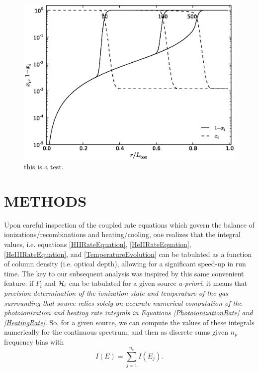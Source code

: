 \documentclass[preprint2]{aastex}              %
\begin{document}
\begin{figure}[htbp]
\begin{center}
\includegraphics[scale=0.4]{figures/RT_Test1_RadialProfiles.ps}
\caption{this is a test.}
\label{fig:test}
\end{center}
\end{figure}








\section{METHODS}
Upon careful inspection of the coupled rate equations which govern the balance of ionizations/recombinations and heating/cooling, one realizes that the integral values, i.e. equations \ref{HIIRateEquation}, \ref{HeIIRateEquation}, \ref{HeIIIRateEquation}, and \ref{TemperatureEvolution} can be tabulated as a function of column density (i.e. optical depth), allowing for a significant speed-up in run time.  The key to our subsequent analysis was inspired by this same convenient feature: if $\Gamma_i$ and $\mathcal{H}_i$ can be tabulated for a given source \textit{a-priori}, it means that \textit{precision determination of the ionization state and temperature of the gas surrounding that source relies solely on accurate numerical computation of the photoionization and heating rate integrals in Equations \ref{PhotoionizationRate} and \ref{HeatingRate}}.  So, for a given source, we can compute the values of these integrals numerically for the continuous spectrum, and then as discrete sums given $n_{\nu}$ frequency bins with 
\begin{equation}
    I(E) = \sum_{j=1}^{n_{\nu}} I(E_j) .
\end{equation}
\end{document}
